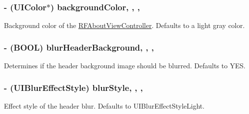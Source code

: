 \subsubsection[{background\+Color}]{\setlength{\rightskip}{0pt plus 5cm}-\/ (U\+I\+Color$\ast$) background\+Color\hspace{0.3cm}{\ttfamily [read]}, {\ttfamily [write]}, {\ttfamily [nonatomic]}, {\ttfamily [strong]}}\label{interface_r_f_about_view_controller_afd81a5d5de125276ca18ebe3be0c69e1}
Background color of the \hyperlink{interface_r_f_about_view_controller}{R\+F\+About\+View\+Controller}. Defaults to a light gray color. \hypertarget{interface_r_f_about_view_controller_a00f6a4a8433aa3571b40529ae8daf3bf}{}
\subsubsection[{blur\+Header\+Background}]{\setlength{\rightskip}{0pt plus 5cm}-\/ (B\+O\+O\+L) blur\+Header\+Background\hspace{0.3cm}{\ttfamily [read]}, {\ttfamily [write]}, {\ttfamily [nonatomic]}, {\ttfamily [assign]}}\label{interface_r_f_about_view_controller_a00f6a4a8433aa3571b40529ae8daf3bf}
Determines if the header background image should be blurred. Defaults to Y\+E\+S. \hypertarget{interface_r_f_about_view_controller_a6dc25664d6ce6038b0d3b3e89641f945}{}
\subsubsection[{blur\+Style}]{\setlength{\rightskip}{0pt plus 5cm}-\/ (U\+I\+Blur\+Effect\+Style) blur\+Style\hspace{0.3cm}{\ttfamily [read]}, {\ttfamily [write]}, {\ttfamily [nonatomic]}, {\ttfamily [assign]}}\label{interface_r_f_about_view_controller_a6dc25664d6ce6038b0d3b3e89641f945}
Effect style of the header blur. Defaults to U\+I\+Blur\+Effect\+Style\+Light. \hypertarget{interface_r_f_about_view_controller_a4c900f72531fa3ec5ca7d2db38d3fed8}{}
